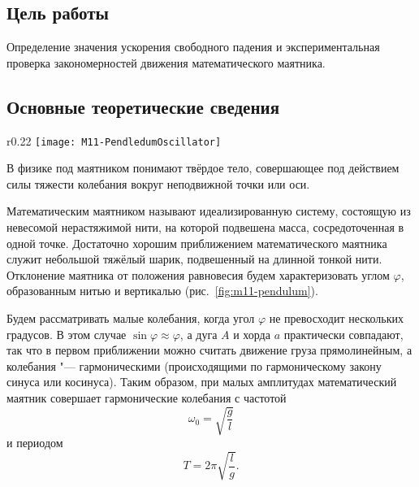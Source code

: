 \documentclass[a4paper, 12pt]{extarticle}
\begin{document}
\MTDTitlePage
\MTDInfoPage

\setcounter{section}{11}

\subsection{Цель работы}
Определение значения ускорения свободного падения и экспериментальная проверка закономерностей движения математического маятника.

\subsection{Основные теоретические сведения}

\begin{wrapfigure}{r}{0.22\textwidth}
 \centering
\texttt{[image: M11-PendledumOscillator]}
\caption{\label{fig:m11-pendulum}}
\end{wrapfigure}

В физике под маятником понимают твёрдое тело, совершающее под действием силы тяжести колебания вокруг неподвижной точки или оси.

Математическим маятником называют идеализированную систему, состоящую из невесомой нерастяжимой нити, на которой подвешена масса, сосредоточенная в одной точке. Достаточно хорошим приближением математического маятника служит небольшой тяжёлый шарик, подвешенный на длинной тонкой нити. Отклонение маятника от положения равновесия будем характеризовать углом $\varphi$, образованным нитью и вертикалью (рис.~\ref{fig:m11-pendulum}). %

Будем рассматривать малые колебания, когда угол $\varphi$ не превосходит нескольких градусов. В этом случае $\sin \varphi \approx \varphi$, а дуга $A$ и хорда $a$ практически совпадают, так что в первом приближении можно считать движение груза прямолинейным, а колебания "--- гармоническими (происходящими по гармоническому закону синуса или косинуса). Таким образом, при малых амплитудах математический маятник совершает гармонические колебания с частотой \[\omega_0 = \sqrt{\frac{g}{l}}\] и периодом \[T = 2 \pi \sqrt{\frac{l}{g}}.\] %
\end{document}
